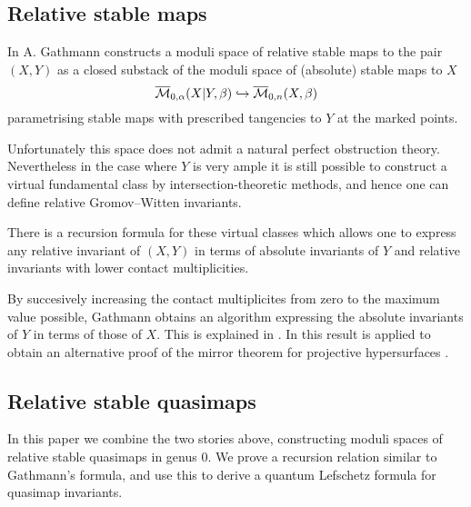 
\subsection{Relative stable maps}
In \cite{Ga} A. Gathmann constructs a moduli space of relative stable maps to the pair $(X,Y)$ as a closed substack of the moduli space of (absolute) stable maps to $X$
\begin{equation*} \overline{\mathcal M}_{0,\alpha}(X|Y,\beta) \hookrightarrow \overline{\mathcal M}_{0,n}(X,\beta) \end{equation*}
parametrising stable maps with prescribed tangencies to $Y$ at the marked points.

Unfortunately this space does not admit a natural perfect obstruction theory. Nevertheless in the case where $Y$ is very ample it is still possible to construct a virtual fundamental class by intersection-theoretic methods, and hence one can define relative Gromov--Witten invariants.

There is a recursion formula for these virtual classes which allows one to express any relative invariant of $(X,Y)$ in terms of absolute invariants of $Y$ and relative invariants with lower contact multiplicities. 


By succesively increasing the contact multiplicites from zero to the maximum value possible, Gathmann obtains an algorithm expressing the absolute invariants of $Y$ in terms of those of $X$. This is explained in \cite[Corollary 5.7]{Ga}. In \cite{Ga-MF} this result is applied to obtain an alternative proof of the mirror theorem for projective hypersurfaces \cite{Giv} \cite{LLY}.

\subsection{Relative stable quasimaps}
In this paper we combine the two stories above, constructing moduli spaces of relative stable quasimaps in genus $0$. We prove a recursion relation similar to Gathmann's formula, and use this to derive a quantum Lefschetz formula for quasimap invariants.

